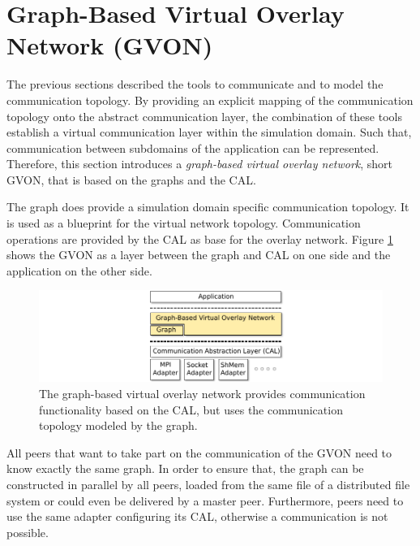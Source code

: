 \section{Graph-Based Virtual Overlay Network (GVON)}
\label{sec:gvon}
The previous sections described the tools to communicate and to
model the communication topology. By providing an explicit mapping of
the communication topology onto the abstract communication layer,
the combination of these tools establish a virtual communication layer
within the simulation domain.  Such that, communication between
subdomains of the application can be represented. Therefore, this
section introduces a \textit{graph-based virtual overlay network},
short GVON, that is based on the graphs and the CAL.

The graph does provide a simulation domain specific communication topology.  It is
used as a blueprint for the virtual network topology.  Communication
operations are provided by the CAL as base for the overlay network.
Figure \ref{fig:gvon} shows the GVON as a layer between the graph and
CAL on one side and the application on the other side.

\begin{figure}[H]
  \centering \includegraphics[width=\textwidth]{graphics/30_gvon}
  \caption{The graph-based virtual overlay network provides
    communication functionality based on the CAL, but uses the
    communication topology modeled by the graph.}
  \label{fig:gvon}
\end{figure}

All peers that want to take part on the communication of the GVON need
to know exactly the same graph. In order to ensure that, the graph can be
constructed in parallel by all peers, loaded from the same file of a
distributed file system or could even be delivered by a master
peer. Furthermore, peers need to use the same adapter configuring its
CAL, otherwise a communication is not possible.


